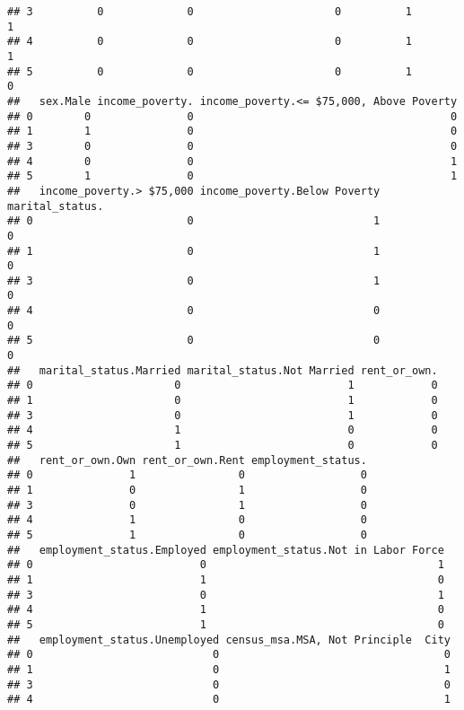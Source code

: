 \documentclass[
]{article}
\begin{document}
\begin{verbatim}
## 3          0             0                      0          1          1
## 4          0             0                      0          1          1
## 5          0             0                      0          1          0
##   sex.Male income_poverty. income_poverty.<= $75,000, Above Poverty
## 0        0               0                                        0
## 1        1               0                                        0
## 3        0               0                                        0
## 4        0               0                                        1
## 5        1               0                                        1
##   income_poverty.> $75,000 income_poverty.Below Poverty marital_status.
## 0                        0                            1               0
## 1                        0                            1               0
## 3                        0                            1               0
## 4                        0                            0               0
## 5                        0                            0               0
##   marital_status.Married marital_status.Not Married rent_or_own.
## 0                      0                          1            0
## 1                      0                          1            0
## 3                      0                          1            0
## 4                      1                          0            0
## 5                      1                          0            0
##   rent_or_own.Own rent_or_own.Rent employment_status.
## 0               1                0                  0
## 1               0                1                  0
## 3               0                1                  0
## 4               1                0                  0
## 5               1                0                  0
##   employment_status.Employed employment_status.Not in Labor Force
## 0                          0                                    1
## 1                          1                                    0
## 3                          0                                    1
## 4                          1                                    0
## 5                          1                                    0
##   employment_status.Unemployed census_msa.MSA, Not Principle  City
## 0                            0                                   0
## 1                            0                                   1
## 3                            0                                   0
## 4                            0                                   1

\end{verbatim}
\end{document}
